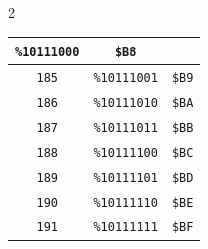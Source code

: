 \begin{multicols}{2}
\begin{center}
\begin{tabular}{|c|c|c|}
\texttt{\%10111000} &  \texttt{\$B8} \\ \hline \texttt{185} & \texttt{\%10111001} &  \texttt{\$B9} \\ \hline \texttt{186} & \texttt{\%10111010} &  \texttt{\$BA} \\ \hline \texttt{187} & \texttt{\%10111011} &  \texttt{\$BB} \\ \hline \texttt{188} & \texttt{\%10111100} &  \texttt{\$BC} \\ \hline \texttt{189} & \texttt{\%10111101} &  \texttt{\$BD} \\ \hline \texttt{190} & \texttt{\%10111110} &  \texttt{\$BE} \\ \hline \texttt{191} & \texttt{\%10111111} &  \texttt{\$BF} \\ \hline
\end{tabular}
\end{center}
\end{multicols}

\vspace*{\fill}

\clearpage

\vspace*{\fill}

